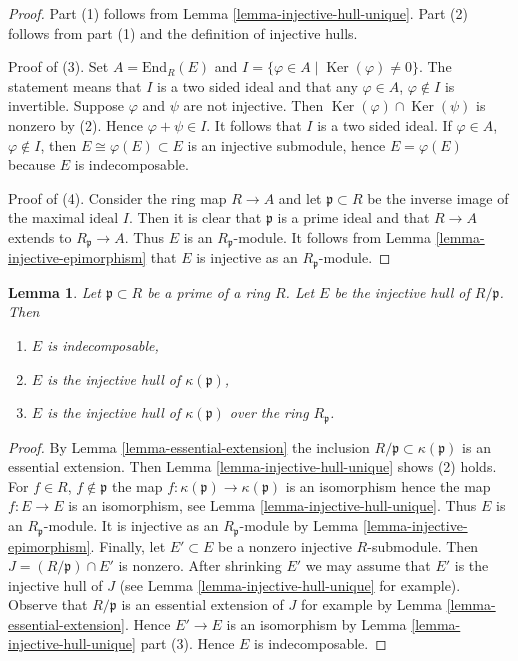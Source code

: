 \documentclass{stacks-project}
\theoremstyle{plain}
\newtheorem{lemma}[subsection]{Lemma}
\theoremstyle{definition}
\theoremstyle{remark}
\numberwithin{equation}{subsection}
\def\Ker{\mathop{\mathrm{Ker}}}
\begin{document}
\begin{proof}
Part (1) follows from Lemma \ref{lemma-injective-hull-unique}.
Part (2) follows from part (1) and the definition of injective hulls.

\medskip\noindent
Proof of (3). Set $A = \text{End}_R(E)$ and
$I = \{\varphi \in A \mid \Ker(\varphi) \not = 0\}$.
The statement means that $I$ is a two sided ideal and
that any $\varphi \in A$, $\varphi \not \in I$ is invertible.
Suppose $\varphi$ and $\psi$ are not injective.
Then $\Ker(\varphi) \cap \Ker(\psi)$ is nonzero
by (2). Hence $\varphi + \psi \in I$. It follows that $I$
is a two sided ideal. If $\varphi \in A$, $\varphi \not \in I$,
then $E \cong \varphi(E) \subset E$ is an injective submodule,
hence $E = \varphi(E)$ because $E$ is indecomposable.

\medskip\noindent
Proof of (4). Consider the ring map $R \to A$ and let $\mathfrak p \subset R$
be the inverse image of the maximal ideal $I$. Then it is clear
that $\mathfrak p$ is a prime ideal and that $R \to A$ extends to
$R_\mathfrak p \to A$. Thus $E$ is an $R_\mathfrak p$-module.
It follows from Lemma \ref{lemma-injective-epimorphism} that $E$ is injective
as an $R_\mathfrak p$-module.
\end{proof}

\begin{lemma}
\label{lemma-injective-hull-indecomposable}
Let $\mathfrak p \subset R$ be a prime of a ring $R$.
Let $E$ be the injective hull of $R/\mathfrak p$. Then
\begin{enumerate}
\item $E$ is indecomposable,
\item $E$ is the injective hull of $\kappa(\mathfrak p)$,
\item $E$ is the injective hull of $\kappa(\mathfrak p)$
over the ring $R_\mathfrak p$.
\end{enumerate}
\end{lemma}

\begin{proof}
By Lemma \ref{lemma-essential-extension} the inclusion
$R/\mathfrak p \subset \kappa(\mathfrak p)$ is an essential
extension. Then Lemma \ref{lemma-injective-hull-unique}
shows (2) holds. For $f \in R$, $f \not \in \mathfrak p$
the map $f : \kappa(\mathfrak p) \to \kappa(\mathfrak p)$ is an isomorphism
hence the map $f : E \to E$ is an isomorphism,
see Lemma \ref{lemma-injective-hull-unique}.
Thus $E$ is an $R_\mathfrak p$-module. It is injective
as an $R_\mathfrak p$-module by Lemma \ref{lemma-injective-epimorphism}.
Finally, let $E' \subset E$ be a nonzero injective $R$-submodule.
Then $J = (R/\mathfrak p) \cap E'$ is nonzero. After shrinking $E'$
we may assume that $E'$ is the injective hull of $J$ (see
Lemma \ref{lemma-injective-hull-unique} for example).
Observe that $R/\mathfrak p$ is an essential extension of $J$ for example by
Lemma \ref{lemma-essential-extension}. Hence $E' \to E$
is an isomorphism by Lemma \ref{lemma-injective-hull-unique} part (3).
Hence $E$ is indecomposable.
\end{proof}
\end{document}
